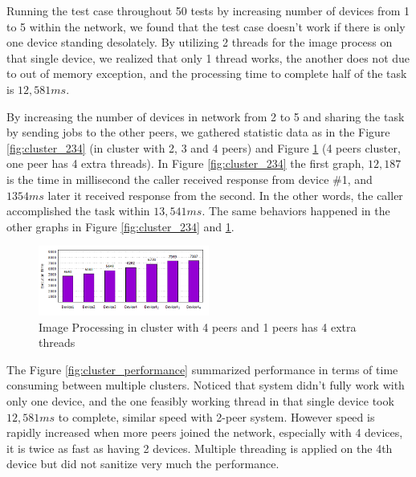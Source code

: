 \documentclass[conference]{IEEEtran}
\begin{document}
Running the test case throughout 50 tests by increasing number of devices from 1 to 5 within the network, we found that the test case doesn't work if there is only one device standing desolately. By utilizing 2 threads for the image process on that single device, we realized that only 1 thread works, the another does not due to out of memory exception, and the processing time to complete half of the task is $12,581ms$. 

By increasing the number of devices in network from 2 to 5 and sharing the task by sending jobs to the other peers, we gathered statistic data as in the Figure \ref{fig:cluster_234} (in cluster with 2, 3 and 4 peers) and Figure \ref{fig:cluster_4m} (4 peers cluster, one peer has 4 extra threads). In Figure \ref{fig:cluster_234} the first graph, $12,187$ is the time in millisecond the caller received response from device \#1, and $1354ms$ later it received response from the second. In the other words, the caller accomplished the task within $13,541ms$. The same behaviors happened in the other graphs in Figure \ref{fig:cluster_234} and \ref{fig:cluster_4m}.  
 


\begin{figure}[!hbt]
\centerline {
\includegraphics[width=0.5\textwidth, natwidth=599, natheight=245]{data/c_5}
}
\caption{Image Processing in cluster with 4 peers and 1 peers has 4 extra threads}
\label{fig:cluster_4m}
\end{figure}


The Figure \ref{fig:cluster_performance} summarized performance in terms of time consuming between multiple clusters. Noticed that system didn't fully work with only one device, and the one feasibly working thread in that single device took $12,581ms$ to complete, similar speed with 2-peer system. However speed is rapidly increased when more peers joined the network, especially with 4 devices, it is twice as fast as having 2 devices. Multiple threading is applied on the 4th device but did not sanitize very much the performance. 
\end{document}
